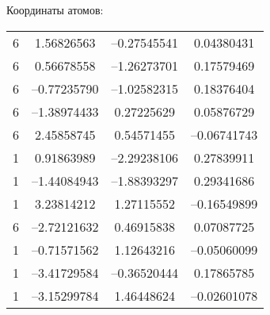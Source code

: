 {Координаты атомов:
\begin{center}
\begin{tabular}{cccc}
   6  &   1.56826563 & --0.27545541 &  0.04380431\\
   6   &  0.56678558 & --1.26273701 &  0.17579469\\
   6  &  --0.77235790 & --1.02582315 &  0.18376404\\
   6  &  --1.38974433 &  0.27225629 &  0.05876729\\
   6  &   2.45858745 &  0.54571455 & --0.06741743\\
   1  &   0.91863989 & --2.29238106 &  0.27839911\\
   1  &  --1.44084943 & --1.88393297 &  0.29341686\\
   1  &   3.23814212 &  1.27115552 & --0.16549899\\
   6  &  --2.72121632 &  0.46915838 &  0.07087725\\
   1  &  --0.71571562 &  1.12643216 & --0.05060099\\
   1  &  --3.41729584 & --0.36520444 &  0.17865785\\
   1  &  --3.15299784 &  1.46448624 & --0.02601078\\

  \end{tabular}
\end{center}

}
